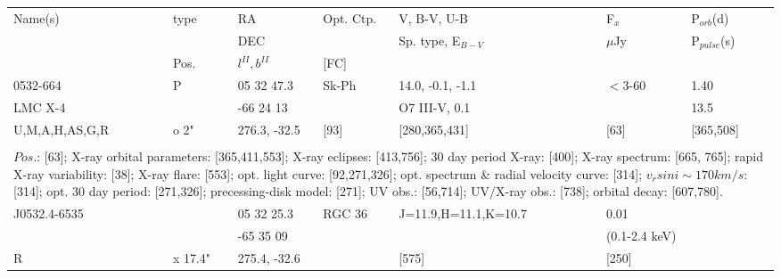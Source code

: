 \documentclass{aa}
\begin{document}
\clearpage\begin{table*}[h]
\begin{tabular}{p{2.5cm}p{1cm}p{1.8cm}p{2.3cm}p{3.3cm}p{2.0cm}p{2.2cm}}
\noalign{\smallskip}
\multicolumn{7}{p{17.5cm}}{Table 1.  (continued) }\\        
\hline
\noalign{\smallskip}
Name(s)      & type  & RA                       &  Opt. Ctp. & V, B-V, U-B                    &   F$_{x}$           & P$_{orb}$(d)    \\
                      &            &  DEC                   &                     &  Sp. type, E$_{B-V}$  &    $\mu$Jy        & P$_{pulse}$(s) \\
                      & Pos.  &  $l^{II}, b^{II}$     &  [FC]           &                                          &                            &                             \\
\noalign{\smallskip} 

\hline
\noalign{\smallskip}
 0532-664                    &   P        & 05 32 47.3        & Sk-Ph              & 14.0, -0.1, -1.1       &   $<$3-60    &     1.40       \\
 LMC X-4                     &             & -66 24 13          &                           & O7 III-V, 0.1           &                     &       13.5        \\
U,M,A,H,AS,G,R        &  o 2"   & 276.3, -32.5      &     [93]             &    [280,365,431]     &        [63]      &  [365,508]         \\
\\
\multicolumn{7}{p{17.5cm}}{
$Pos$.: [63]; X-ray orbital parameters: [365,411,553]; X-ray eclipses: [413,756]; 30 day period X-ray: [400];
X-ray spectrum: [665, 765]; rapid X-ray variability: [38]; X-ray flare: [553]; opt. light curve: [92,271,326]; 
opt. spectrum \& radial velocity curve: [314]; $v_rsin i \sim 170 km/s$: [314]; opt. 30 day period: [271,326]; 
precessing-disk model: [271]; UV obs.: [56,714]; UV/X-ray obs.: [738]; orbital decay: [607,780].}\\

\noalign{\smallskip}
\hline
\noalign{\smallskip}
J0532.4-6535 &                 &  05 32 25.3 & RGC 36 & J=11.9,H=11.1,K=10.7          &   0.01                &  \\
                          &                 & -65 35 09    &                 &                                                   &   (0.1-2.4 keV)  &         \\                         
     R                  & x 17.4"   & 275.4, -32.6 &                 &  [575]                                       &    [250]                &  \\
  

\end{tabular}
\end{table*}
\end{document}
